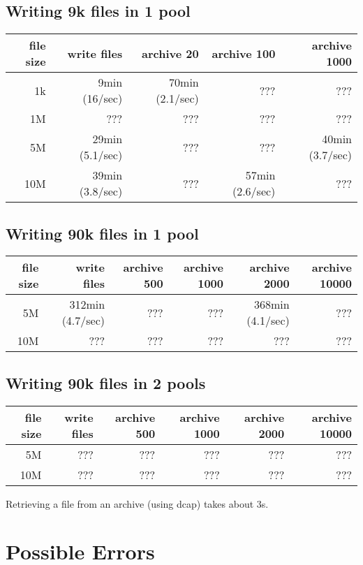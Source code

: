 \documentclass[a4paper,8pt]{scrartcl}
\begin{document}
\subsection{Writing 9k files in 1 pool}

\begin{tabular}{|r|r|r|r|r|}
  \hline
  file size & write files  & archive 20 & archive 100 & archive 1000 \\
  \hline
  1k        &  9min (16/sec)  & 70min (2.1/sec) & ??? & ??? \\
  \hline
  1M        & ??? & ??? & ??? & ??? \\
  \hline
  5M        & 29min (5.1/sec) & ??? & ???             & 40min (3.7/sec) \\
  \hline
  10M       & 39min (3.8/sec) & ??? & 57min (2.6/sec) & ??? \\
  \hline
\end{tabular}

\subsection{Writing 90k files in 1 pool}

\begin{tabular}{|r|r|r|r|r|r|}
  \hline
  file size & write files  & archive 500 & archive 1000 & archive 2000 & archive 10000 \\
  \hline
  5M        & 312min (4.7/sec) & ??? & ??? & 368min (4.1/sec) & ??? \\
  \hline
  10M       & ??? & ??? & ??? & ??? & ??? \\
  \hline
\end{tabular}

\subsection{Writing 90k files in 2 pools}

\begin{tabular}{|r|r|r|r|r|r|}
  \hline
  file size & write files  & archive 500 & archive 1000 & archive 2000 & archive 10000 \\
  \hline
  5M        & ??? & ??? & ??? & ??? & ??? \\
  \hline
  10M       & ??? & ??? & ??? & ??? & ??? \\
  \hline
\end{tabular}


Retrieving a file from an archive (using dcap) takes about 3s.

\section{Possible Errors}
\end{document}
